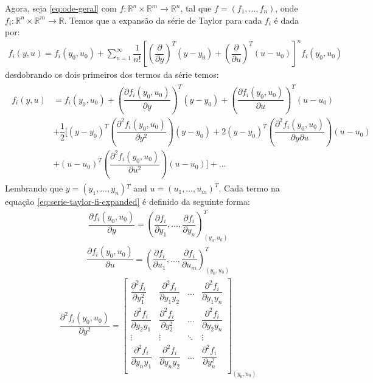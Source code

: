 \documentclass[12pt,a4paper]{article}
\begin{document}
Agora, seja \eqref{eq:ode-geral} com \(f:\mathbb{R}^{n}\times\mathbb{R}^{m}\to\mathbb{R}^{n}\), tal que \(f=(f_{1},\ldots,f_{n})\), onde \(f_{i}:\mathbb{R}^{n}\times\mathbb{R}^{m}\to\mathbb{R}\). Temos que a expansão da série de Taylor para cada \(f_{i}\) é dada por:
\begin{align}
  f_{i}(y,u)=f_{i}(y_{0},u_{0})+\sum_{n=1}^{\infty}\dfrac{1}{n!}\left[\left(\dfrac{\partial }{\partial y}\right)^{T}(y-y_{0}) + \left(\dfrac{\partial}{\partial u}\right)^{T}(u-u_{0})\right]^{n}f_{i}(y_{0},u_{0})
  \label{eq:serie-taylor-fi}
\end{align}
desdobrando os dois primeiros dos termos da série temos:
\begin{align}
  \begin{split}
    f_{i}(y,u)&=f_{i}(y_{0},u_{0})+\left(\dfrac{\partial f_{i}(y_{0},u_{0})}{\partial y}\right)^{T}(y-y_{0}) + \left(\dfrac{\partial f_{i}(y_{0},u_{0})}{\partial u}\right)^{T}(u-u_{0})\\
              & + \dfrac{1}{2}\bigg[(y-y_{0})^{T}\left(\dfrac{\partial^{2} f_{i}(y_{0},u_{0})}{\partial y^{2}}\right)(y-y_{0}) + 2(y-y_{0})^{T}\left(\dfrac{\partial^{2}f_{i}(y_{0},u_{0})}{\partial y\partial u}\right)(u-u_{0})\\
    &+  (u-u_{0})^{T}\left(\dfrac{\partial^{2} f_{i}(y_{0},u_{0})}{\partial u^{2}}\right)(u-u_{0})\bigg] + \ldots
  \end{split}
  \label{eq:serie-taylor-fi-expanded}
\end{align}
Lembrando que \(y=(y_{1},\dots,y_{n})\)$^{T}$ and \(u=(u_{1},\ldots,u_{m})^{T}\). Cada termo na equação \eqref{eq:serie-taylor-fi-expanded} é definido da seguinte forma:
\begin{align}
  \dfrac{\partial f_{i}(y_{0},u_{0})}{\partial y}=\left(\dfrac{\partial f_{i}}{\partial y_{1}},\ldots,\dfrac{\partial f_{i}}{\partial y_{n}}\right)^{T}_{(y_{0},u_{0})}
  \label{eq:jacobian-y}
\end{align}
\begin{align}
  \dfrac{\partial f_{i}(y_{0},u_{0})}{\partial u}=\left(\dfrac{\partial f_{i}}{\partial u_{1}},\ldots,\dfrac{\partial f_{i}}{\partial u_{m}}\right)^{T}_{(y_{0},u_{0})}
  \label{eq:jacobian-u}
\end{align}
\renewcommand{\arraystretch}{2.5}
\begin{align}
  \dfrac{\partial^{2} f_{i}(y_{0},u_{0})}{\partial y^{2}} =
  \begin{bmatrix}
    \dfrac{\partial^{2} f_{i}}{\partial y^{2}_{1}}&\dfrac{\partial^{2} f_{i}}{\partial y_{1}y_{2}}&\ldots&\dfrac{\partial^{2} f_{i}}{\partial y_{1}y_{n}}\\
    \dfrac{\partial^{2} f_{i}}{\partial y_{2}y_{1}}&\dfrac{\partial^{2} f_{i}}{\partial y_{2}^{2}}&\ldots&\dfrac{\partial^{2} f_{i}}{\partial y_{2}y_{n}}\\
    \vdots &\vdots&\ddots&\vdots\\
    \dfrac{\partial^{2} f_{i}}{\partial y_{n}y_{1}}&\dfrac{\partial^{2} f_{i}}{\partial y_{n}y_{2}}&\ldots&\dfrac{\partial^{2} f_{i}}{\partial y_{n}^{2}}\\
  \end{bmatrix}_{(y_{0},u_{0})}
  \label{eq:hessian-yy}
\end{align}
\end{document}
